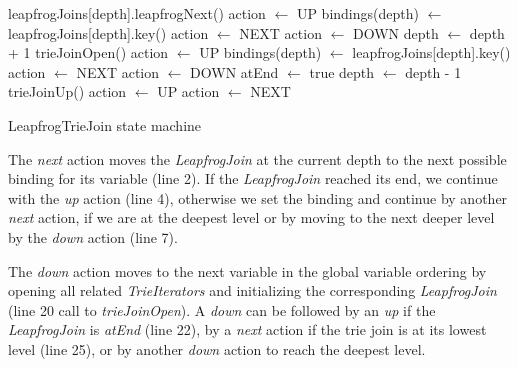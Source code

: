 \begin{algorithm}
     {
       {
         {
            leapfrogJoins[depth].leapfrogNext() \;
             {
                action $\leftarrow$ UP \;
            } {
                bindings(depth) $\leftarrow$ leapfrogJoins[depth].key() \;
                 {
                    action $\leftarrow$ NEXT
                } {
                    action $\leftarrow$ DOWN
                }
            }
        }
        {
          depth $\leftarrow$ depth + 1 \;
          trieJoinOpen() \;
           {
            action $\leftarrow$ UP \;
          } {
            bindings(depth) $\leftarrow$ leapfrogJoins[depth].key() \;
           {
             action $\leftarrow$ NEXT
          } {
            action $\leftarrow$ DOWN
          }
          }
       }
         {
           {
            atEnd $\leftarrow$ true \;
          } {
            depth $\leftarrow$ depth - 1 \;
            trieJoinUp() \;
             {
                action $\leftarrow$ UP \;
            } {
                action $\leftarrow$ NEXT \;
            }    
          }
        }
      }
    }  
    \caption{LeapfrogTrieJoin state machine}
    \label{alg:leapfrogTrieJoin-state-machine}
\end{algorithm}
The \textit{next} action moves the \textit{LeapfrogJoin} at the current depth to the next possible binding for its variable (line 2). %
If the \textit{LeapfrogJoin} reached its end, we continue with the \textit{up} action (line 4), %
otherwise we set the binding and continue by another \textit{next} action, if we are at the deepest level or by moving
to the next deeper level by the \textit{down} action (line 7). %

The \textit{down} action moves to the next variable in the global variable ordering by opening all related \textit{TrieIterators}
and initializing the corresponding \textit{LeapfrogJoin} (line 20 call to \textit{trieJoinOpen}). %
A \textit{down} can be followed by an \textit{up} if the \textit{LeapfrogJoin} is \textit{atEnd} (line 22),
by a \textit{next} action if the trie join is at its lowest level (line 25), or by another \textit{down} action to reach the deepest level.

